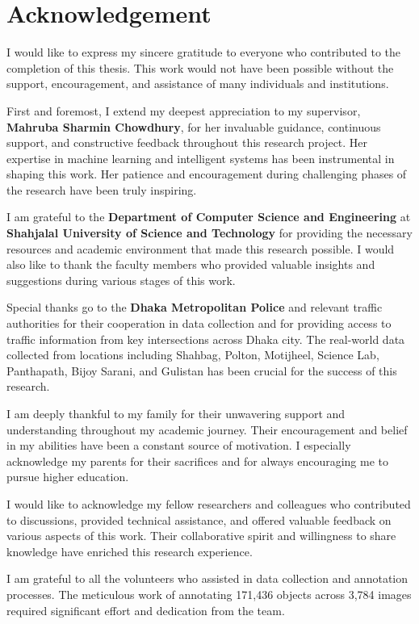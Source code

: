 \chapter*{Acknowledgement}

I would like to express my sincere gratitude to everyone who contributed to the completion of this thesis. This work would not have been possible without the support, encouragement, and assistance of many individuals and institutions.

First and foremost, I extend my deepest appreciation to my supervisor, \textbf{Mahruba Sharmin Chowdhury}, for her invaluable guidance, continuous support, and constructive feedback throughout this research project. Her expertise in machine learning and intelligent systems has been instrumental in shaping this work. Her patience and encouragement during challenging phases of the research have been truly inspiring.

I am grateful to the \textbf{Department of Computer Science and Engineering} at \textbf{Shahjalal University of Science and Technology} for providing the necessary resources and academic environment that made this research possible. I would also like to thank the faculty members who provided valuable insights and suggestions during various stages of this work.

Special thanks go to the \textbf{Dhaka Metropolitan Police} and relevant traffic authorities for their cooperation in data collection and for providing access to traffic information from key intersections across Dhaka city. The real-world data collected from locations including Shahbag, Polton, Motijheel, Science Lab, Panthapath, Bijoy Sarani, and Gulistan has been crucial for the success of this research.

I am deeply thankful to my family for their unwavering support and understanding throughout my academic journey. Their encouragement and belief in my abilities have been a constant source of motivation. I especially acknowledge my parents for their sacrifices and for always encouraging me to pursue higher education.

I would like to acknowledge my fellow researchers and colleagues who contributed to discussions, provided technical assistance, and offered valuable feedback on various aspects of this work. Their collaborative spirit and willingness to share knowledge have enriched this research experience.

I am grateful to all the volunteers who assisted in data collection and annotation processes. The meticulous work of annotating 171,436 objects across 3,784 images required significant effort and dedication from the team.

